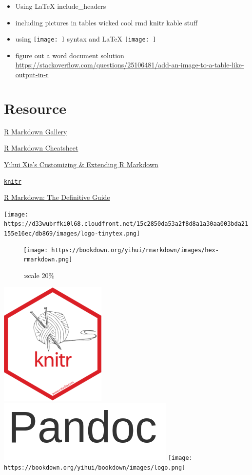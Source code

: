 \documentclass[]{article}
\begin{document}
\begin{itemize}
\item
  Using LaTeX include\_headers
\item
  including pictures in tables wicked cool rmd knitr kable stuff
\item
  using \texttt{[image: ]} syntax and LaTeX \texttt{[image: ]}
\item
  figure out a word document solution
  \url{https://stackoverflow.com/questions/25106481/add-an-image-to-a-table-like-output-in-r}
\end{itemize}

\hypertarget{resource}{%
\section{Resource}\label{resource}}

\href{https://rmarkdown.rstudio.com/gallery.html}{R Markdown Gallery}

\href{https://github.com/rstudio/cheatsheets/raw/master/rmarkdown-2.0.pdf}{R
Markdown Cheatsheet}

\href{https://slides.yihui.name/2017-rstudio-conf-ext-rmd-Yihui-Xie.html\#1}{Yihui
Xie's Customizing \& Extending R Markdown}

\href{https://github.com/yihui/knitr}{\texttt{knitr}}

\href{https://bookdown.org/yihui/rmarkdown/}{R Markdown: The Definitive
Guide}

\texttt{[image: https://d33wubrfki0l68.cloudfront.net/15c2850da53a2f8d8a1a30aa003bda21155e16ec/db869/images/logo-tinytex.png]}

\begin{figure}
\centering
\texttt{[image: https://bookdown.org/yihui/rmarkdown/images/hex-rmarkdown.png]}
\caption{:scale 20\%}
\end{figure}

\includegraphics{images/knit-logo.png}
\includegraphics{images/pandoc.png}
\texttt{[image: https://bookdown.org/yihui/bookdown/images/logo.png]}
\end{document}
